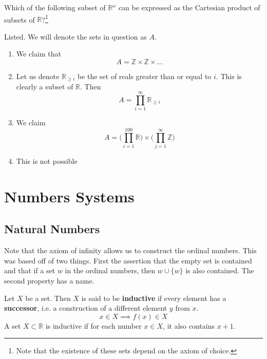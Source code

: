 \documentclass{article}
\begin{document}
    \begin{exercise} 
      Which of the following subset of $\mathbb{R}^\omega$ can be expressed as the Cartesian product of subsets of $\mathbb{R}$?\footnote{Note that the existence of these sets depend on the axiom of choice.}
    \end{exercise}
    \begin{solution}
      Listed. We will denote the sets in question as $A$. 
      \begin{enumerate}
        \item We claim that 
          \begin{equation}
            A = \mathbb{Z} \times \mathbb{Z} \times \ldots
          \end{equation}
        \item Let us denote $\mathbb{R}_{\geq i}$ be the set of reals greater than or equal to $i$. This is clearly a subset of $\mathbb{R}$. Then 
          \begin{equation}
            A = \prod_{i=1}^\infty \mathbb{R}_{\geq i}
          \end{equation}
        \item We claim 
          \begin{equation}
            A = \bigg( \prod_{i=1}^{100} \mathbb{R} \bigg) \times \bigg( \prod_{j=1}^\infty \mathbb{Z} \bigg)
          \end{equation}
        \item This is not possible
      \end{enumerate}
      
    \end{solution}

\section{Numbers Systems} 

  \subsection{Natural Numbers}

    Note that the axiom of infinity allows us to construct the ordinal numbers. This was based off of two things. First the assertion that the empty set is contained and that if a set $w$ in the ordinal numbers, then $w \cup \{w\}$ is also contained. The second property has a name. 

    \begin{definition} 
      Let $X$ be a set. Then $X$ is said to be \textbf{inductive} if every element has a \textbf{successor}, i.e. a construction of a different element $y$ from $x$.  
      \begin{equation}
        x \in X \implies f(x) \in X
      \end{equation}
      A set 
      $X \subset \mathbb{R}$ is inductive if for each number $x \in X$, it also contains $x + 1$. 
    \end{definition} 
\end{document}
